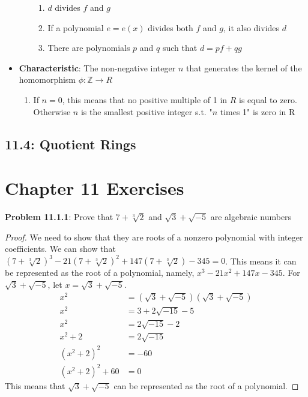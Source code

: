 \documentclass[12pt]{article}
\begin{document}
\begin{itemize}
\begin{enumerate}
\begin{enumerate}
      \item $d$ divides $f$ and $g$
      \item If a polynomial $e = e(x)$ divides both $f$ and $g$, it also divides $d$
      \item There are polynomials $p$ and $q$ such that $d = pf + qg$
    \end{enumerate}
  \end{enumerate}
  \item \textbf{Characteristic}: The non-negative integer $n$ that generates the kernel of the homomorphism $\phi: \mathbb{Z} \to R$
  \begin{enumerate}
    \item If $n = 0$, this means that no positive multiple of 1 in $R$ is equal to zero. Otherwise $n$ is the smallest positive integer s.t. "$n$ times 1" is zero in R
  \end{enumerate}
\end{itemize}

\subsection*{11.4: Quotient Rings}
\begin{itemize}

\end{itemize}

\section*{Chapter 11 Exercises}
\textbf{Problem 11.1.1}: Prove that $7 + \sqrt[3]{2}$ and $\sqrt{3} + \sqrt{-5}$ are algebraic numbers
\begin{proof}
We need to show that they are roots of a nonzero polynomial with integer coefficients. We can show that $(7 + \sqrt[3]{2})^3 - 21(7 + \sqrt[3]{2})^2 + 147(7 + \sqrt[3]{2}) - 345 = 0$. This means it can be represented as the root of a polynomial, namely, $x^3 - 21x^2 + 147x - 345$. For $\sqrt{3} + \sqrt{-5}$, let $x = \sqrt{3} + \sqrt{-5}$.
\begin{align*}
  x^2 &= (\sqrt{3} + \sqrt{-5})(\sqrt{3} + \sqrt{-5}) \\
  x^2 &= 3 + 2\sqrt{-15} - 5 \\
  x^2 &= 2\sqrt{-15} - 2 \\
  x^2 + 2 &= 2\sqrt{-15} \\
  (x^2 + 2)^2 &= -60 \\
  (x^2 + 2)^2 + 60 &= 0
\end{align*}
This means that $\sqrt{3} + \sqrt{-5}$ can be represented as the root of a polynomial.
\end{proof}
\end{document}
